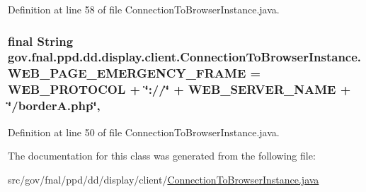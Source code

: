 Definition at line 58 of file Connection\-To\-Browser\-Instance.\-java.

\hypertarget{classgov_1_1fnal_1_1ppd_1_1dd_1_1display_1_1client_1_1ConnectionToBrowserInstance_a1081b866c3ae5aa9f6fe831ea3484d2c}{
\subsubsection[{W\-E\-B\-\_\-\-P\-A\-G\-E\-\_\-\-E\-M\-E\-R\-G\-E\-N\-C\-Y\-\_\-\-F\-R\-A\-M\-E}]{\setlength{\rightskip}{0pt plus 5cm}final String gov.\-fnal.\-ppd.\-dd.\-display.\-client.\-Connection\-To\-Browser\-Instance.\-W\-E\-B\-\_\-\-P\-A\-G\-E\-\_\-\-E\-M\-E\-R\-G\-E\-N\-C\-Y\-\_\-\-F\-R\-A\-M\-E = W\-E\-B\-\_\-\-P\-R\-O\-T\-O\-C\-O\-L + \char`\"{}\-://\char`\"{} + W\-E\-B\-\_\-\-S\-E\-R\-V\-E\-R\-\_\-\-N\-A\-M\-E + \char`\"{}/border\-A.\-php\char`\"{}\hspace{0.3cm}{\ttfamily [static]}, {\ttfamily [protected]}}}\label{classgov_1_1fnal_1_1ppd_1_1dd_1_1display_1_1client_1_1ConnectionToBrowserInstance_a1081b866c3ae5aa9f6fe831ea3484d2c}


Definition at line 50 of file Connection\-To\-Browser\-Instance.\-java.



The documentation for this class was generated from the following file\-:\begin{DoxyCompactItemize}
\item 
src/gov/fnal/ppd/dd/display/client/\hyperlink{ConnectionToBrowserInstance_8java}{Connection\-To\-Browser\-Instance.\-java}\end{DoxyCompactItemize}
